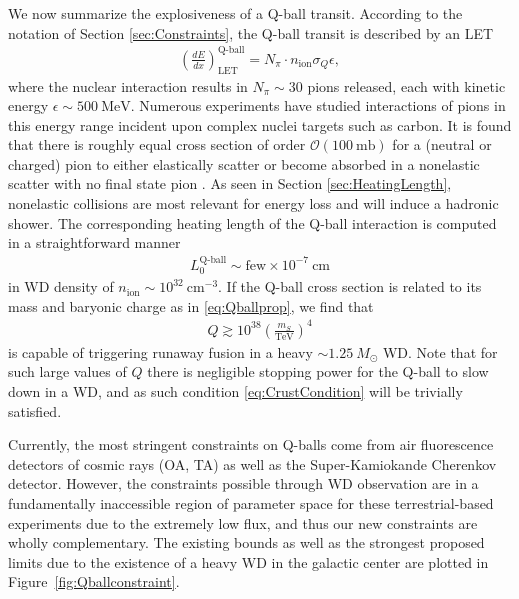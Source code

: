 \documentclass[twocolumn,showpacs,preprintnumbers,amsmath,amssymb,prd]{revtex4}
\newcommand{\OO}{\mathcal{O}}
\def\r{\right)}
\def\l{\left(}
\begin{document}
We now summarize the explosiveness of a Q-ball transit. According to the notation of Section \ref{sec:Constraints}, the Q-ball transit is described by an LET
\begin{align}
\left( \frac{d E}{d x} \right)^\text{Q-ball}_\text{LET} = N_\pi \cdot n_\text{ion} \sigma_Q \epsilon,
\end{align}
where the nuclear interaction results in $N_\pi \sim 30$ pions released, each with kinetic energy $\epsilon \sim 500 ~\text{MeV}$. Numerous experiments have studied interactions of pions in this energy range incident upon complex nuclei targets such as carbon. It is found that there is roughly equal cross section of order $\OO (100 ~\text{mb})$ for a (neutral or charged) pion to either elastically scatter or become absorbed in a nonelastic scatter with no final state pion \cite{Pionnuclear}. As seen in Section \ref{sec:HeatingLength}, nonelastic collisions are most relevant for energy loss and will induce a hadronic shower. The corresponding heating length of the Q-ball interaction is computed in a straightforward manner
\begin{align}
L_0^\text{Q-ball} \sim \text{few} \times 10^{-7} ~\text{cm}
\end{align}
in WD density of $n_\text{ion} \sim 10^{32} ~\text{cm}^{-3}$. If the Q-ball cross section is related to its mass and baryonic charge as in \eqref{eq:Qballprop}, we find that 
\begin{align}
Q \gtrsim 10^{38} \l\frac{m_S}{\text{TeV}}\r^4
\end{align}
is capable of triggering runaway fusion in a heavy $\sim 1.25 ~M_{\odot}$ WD. Note that for such large values of $Q$ there is negligible stopping power for the Q-ball to slow down in a WD, and as such condition \eqref{eq:CrustCondition} will be trivially satisfied.

Currently, the most stringent constraints on Q-balls come from air fluorescence detectors of cosmic rays (OA, TA) as well as the Super-Kamiokande Cherenkov detector. However, the constraints possible through WD observation are in a fundamentally inaccessible region of parameter space for these terrestrial-based experiments due to the extremely low flux, and thus our new constraints are wholly complementary. The existing bounds as well as the strongest proposed limits due to the existence of a heavy WD in the galactic center are plotted in Figure~\ref{fig:Qballconstraint}. 
\end{document}
